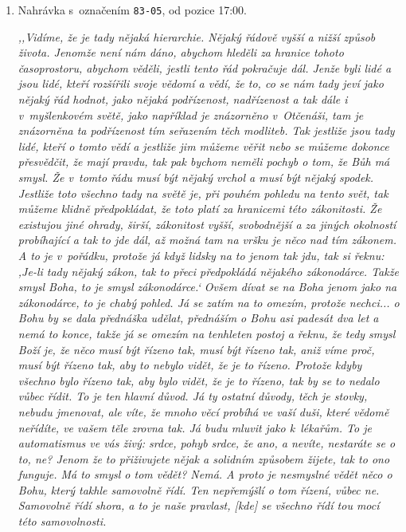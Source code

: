 \begin{enumerate}

\item{
Nahrávka s~označením \texttt{83-05}, od pozice 17:00.

\textit{%
,,Vidíme, že je tady nějaká hierarchie. Nějaký řádově vyšší a nižší způsob
života. Jenomže není nám dáno, abychom hleděli za hranice tohoto časoprostoru,
abychom věděli, jestli tento řád pokračuje dál. Jenže byli lidé a jsou lidé,
kteří rozšířili svoje vědomí a vědí, že to, co se nám tady jeví jako nějaký řád
hodnot, jako nějaká podřízenost, nadřízenost a tak dále i v~myšlenkovém světě,
jako například je znázorněno v~Otčenáši, tam je znázorněna ta podřízenost tím
seřazením těch modliteb. Tak jestliže jsou tady lidé, kteří o tomto vědí a
jestliže jim můžeme věřit nebo se můžeme dokonce přesvědčit, že mají pravdu, tak
pak bychom neměli pochyb o tom, že Bůh má smysl. Že v~tomto řádu musí být nějaký
vrchol a musí být nějaký spodek. Jestliže toto všechno tady na světě je, při
pouhém pohledu na tento svět, tak můžeme klidně předpokládat, že toto platí za
hranicemi této zákonitosti. Že existujou jiné ohrady, širší, zákonitost vyšší,
svobodnější a za jiných okolností probíhající a tak to jde dál, až možná tam na
vršku je něco nad tím zákonem. A to je v~pořádku, protože já když lidsky na to
jenom tak jdu, tak si řeknu: ,Je-li tady nějaký zákon, tak to přeci předpokládá
nějakého zákonodárce. Takže smysl Boha, to je smysl zákonodárce.` Ovšem dívat se
na Boha jenom jako na zákonodárce, to je chabý pohled. Já se zatím na to omezím,
protože nechci... o Bohu by se dala přednáška udělat, přednáším o Bohu asi
padesát dva let a nemá to konce, takže já se omezím na tenhleten postoj a řeknu,
že tedy smysl Boží je, že něco musí být řízeno tak, musí být řízeno tak, aniž
víme proč, musí být řízeno tak, aby to nebylo vidět, že je to řízeno. Protože
kdyby všechno bylo řízeno tak, aby bylo vidět, že je to řízeno, tak by se to
nedalo vůbec řídit. To je ten hlavní důvod. Já ty ostatní důvody, těch je
stovky, nebudu jmenovat, ale víte, že mnoho věcí probíhá ve vaší duši, které
vědomě neřídíte, ve vašem těle zrovna tak. Já budu mluvit jako k~lékařům. To je
automatismus ve vás živý: srdce, pohyb srdce, že ano, a nevíte, nestaráte se o
to, ne? Jenom že to přiživujete nějak a solidním způsobem žijete, tak to ono
funguje. Má to smysl o tom vědět? Nemá. A proto je nesmyslné vědět něco o Bohu,
který takhle samovolně řídí. Ten nepřemýšlí o tom řízení, vůbec ne. Samovolně
řídí shora, a to je naše pravlast, [kde] se všechno řídí tou mocí této samovolnosti.
}}
\end{enumerate}
